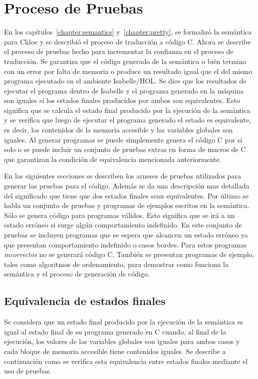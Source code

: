 \chapter{Proceso de Pruebas}\label{chapter:testing}

En los capítulos~\ref{chapter:semantics} y~\ref{chapter:pretty}, se formalizó la semántica para Chloe y se describió el proceso de traducción a código C.
Ahora se describe el proceso de pruebas hecho para incrementar la confianza en el proceso de traducción.
Se garantiza que el código generado de la semántica o bién termina con un error por falta de memoria o produce un resultado igual que el del mismo programa ejecutado en el ambiente Isabelle/HOL.
Se dice que los resultados de ejecutar el programa dentro de Isabelle y el programa generado en la máquina son iguales si los estados finales producidos por ambos son equivalentes.
Esto significa que se calcula el estado final producido por la ejecución de la semántica y se verifica que luego de ejecutar el programa generado el estado es equivalente, es decir, los contenidos de la memoria accesible y las variables globales son iguales.
Al generar programas se puede simplemente genera el código C por si solo o se puede incluir un conjunto de pruebas extras en forma de macros de C que garantizan la condición de equivalencia mencionada anteriormente.

En las siguientes secciones se describen los arneses de pruebas utilizados para generar las pruebas para el código.
Además se da una descripción mas detallada del significado que tiene que dos estados finales sean equivalentes.
Por último se habla un conjunto de pruebas y programas de ejemplos escritos en la semántica.
Sólo se genera código para programas válidos.
Esto significa que se irá a un estado erróneo si surge algún comportamiento indefinido.
En este conjunto de pruebas se incluyen programas que se espera que alcancen un estado erróneo ya que presentan comportamiento indefinido o casos bordes.
Para estos programas \textit{incorrectos} no se generará código C.
También se presentan programas de ejemplo, tales como algoritmos de ordenamiento, para demostrar como funciona la semántica y el proceso de generación de código.


\section{Equivalencia de estados finales}

Se considera que un estado final producido por la ejecución de la semántica es igual al estado final de su programa generado en C cuando, al final de la ejecución, los valores de las variables globales son iguales para ambos casos y cada bloque de memoria accesible tiene contenidos iguales.
Se describe a continuación como se verifica esta equivalencia entre estados finales mediante el uso de pruebas.

